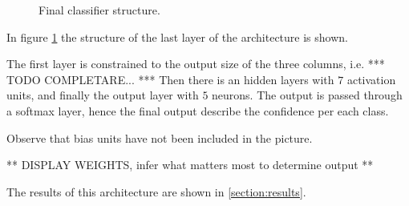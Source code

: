 \begin{figure}
            \caption{Final classifier structure.}\label{fig:mc-cnn:final-classifier-structure}
        \end{figure}
        \par{
            In figure \ref{fig:mc-cnn:final-classifier-structure} the structure of the last layer of the architecture is shown.
        }
        \par{
            The first layer is constrained to the output size of the three columns, i.e. *** TODO COMPLETARE... *** Then there is an hidden layers with $7$ activation units, and finally the output layer with $5$ neurons. The output is passed through a softmax layer, hence the final output describe the confidence per each class.
        }
        \par{
            Observe that bias units have not been included in the picture.
        }
        \par{
            ** DISPLAY WEIGHTS, infer what matters most to determine output **
        }
        \par{
            The results of this architecture are shown in \ref{section:results}.
        }
